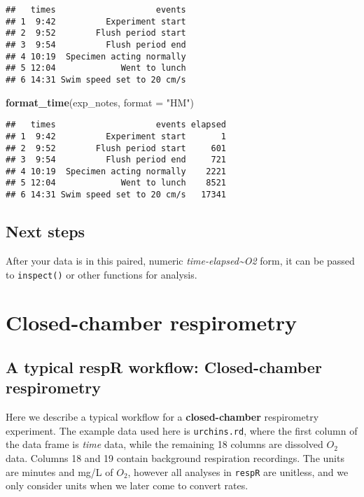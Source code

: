 \documentclass[]{book}
\newenvironment{Shaded}{\begin{snugshade}}{\end{snugshade}}
\newcommand{\KeywordTok}[1]{\textcolor[rgb]{0.13,0.29,0.53}{\textbf{#1}}}
\newcommand{\DataTypeTok}[1]{\textcolor[rgb]{0.13,0.29,0.53}{#1}}
\newcommand{\StringTok}[1]{\textcolor[rgb]{0.31,0.60,0.02}{#1}}
\newcommand{\NormalTok}[1]{#1}
\begin{document}
\begin{verbatim}
##   times                    events
## 1  9:42          Experiment start
## 2  9:52        Flush period start
## 3  9:54          Flush period end
## 4 10:19  Specimen acting normally
## 5 12:04             Went to lunch
## 6 14:31 Swim speed set to 20 cm/s
\end{verbatim}

\begin{Shaded}
\begin{Highlighting}[]
\KeywordTok{format_time}\NormalTok{(exp_notes, }\DataTypeTok{format =} \StringTok{"HM"}\NormalTok{)}
\end{Highlighting}
\end{Shaded}

\begin{verbatim}
##   times                    events elapsed
## 1  9:42          Experiment start       1
## 2  9:52        Flush period start     601
## 3  9:54          Flush period end     721
## 4 10:19  Specimen acting normally    2221
## 5 12:04             Went to lunch    8521
## 6 14:31 Swim speed set to 20 cm/s   17341
\end{verbatim}

\section{Next steps}\label{next-steps}

After your data is in this paired, numeric
\emph{time-elapsed\textasciitilde{}O2} form, it can be passed to
\texttt{inspect()} or other functions for analysis.

\chapter{Closed-chamber respirometry}\label{closed-chamber-respirometry}

\section{A typical respR workflow: Closed-chamber
respirometry}\label{a-typical-respr-workflow-closed-chamber-respirometry}

Here we describe a typical workflow for a \textbf{closed-chamber}
respirometry experiment. The example data used here is
\texttt{urchins.rd}, where the first column of the data frame is
\emph{time} data, while the remaining 18 columns are dissolved
\emph{\(O_2\)} data. Columns 18 and 19 contain background respiration
recordings. The units are minutes and mg/L of \(O_2\), however all
analyses in \texttt{respR} are unitless, and we only consider units when
we later come to convert rates.
\end{document}
